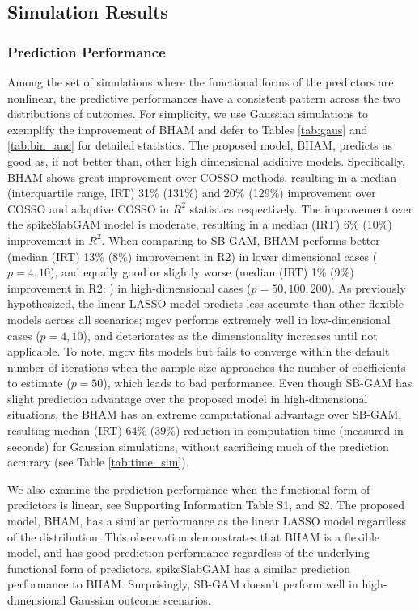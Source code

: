 \documentclass[AMA,STIX1COL,]{WileyNJD-v2}
\begin{document}
\subsection{Simulation Results}
\subsubsection{Prediction Performance}

Among the set of simulations where the functional forms of the
predictors are nonlinear, the predictive performances have a consistent
pattern across the two distributions of outcomes. For simplicity, we use
Gaussian simulations to exemplify the improvement of BHAM and defer to
Tables \ref{tab:gaus} and \ref{tab:bin_auc} for detailed statistics. The
proposed model, BHAM, predicts as good as, if not better than, other
high dimensional additive models. Specifically, BHAM shows great
improvement over COSSO methods, resulting in a median (interquartile
range, IRT) 31\% (131\%) and 20\% (129\%) improvement over COSSO and
adaptive COSSO in \(R^2\) statistics respectively. The improvement over
the spikeSlabGAM model is moderate, resulting in a median (IRT) 6\%
(10\%) improvement in \(R^2\). When comparing to SB-GAM, BHAM performs
better (median (IRT) 13\% (8\%) improvement in R2) in lower dimensional
cases (\(p=4,10\)), and equally good or slightly worse (median (IRT) 1\%
(9\%) improvement in R2: ) in high-dimensional cases
(\(p=50,100, 200\)). As previously hypothesized, the linear LASSO model
predicts less accurate than other flexible models across all scenarios;
mgcv performs extremely well in low-dimensional cases (\(p = 4, 10\)),
and deteriorates as the dimensionality increases until not applicable.
To note, mgcv fits models but fails to converge within the default
number of iterations when the sample size approaches the number of
coefficients to estimate (\(p=50\)), which leads to bad performance.
Even though SB-GAM has slight prediction advantage over the proposed
model in high-dimensional situations, the BHAM has an extreme
computational advantage over SB-GAM, resulting median (IRT) 64\% (39\%)
reduction in computation time (measured in seconds) for Gaussian
simulations, without sacrificing much of the prediction accuracy (see
Table \ref{tab:time_sim}).

We also examine the prediction performance when the functional form of
predictors is linear, see Supporting Information Table S1, and S2. The
proposed model, BHAM, has a similar performance as the linear LASSO
model regardless of the distribution. This observation demonstrates that
BHAM is a flexible model, and has good prediction performance regardless
of the underlying functional form of predictors. spikeSlabGAM has a
similar prediction performance to BHAM. Surprisingly, SB-GAM doesn't
perform well in high-dimensional Gaussian outcome scenarios.
\end{document}
